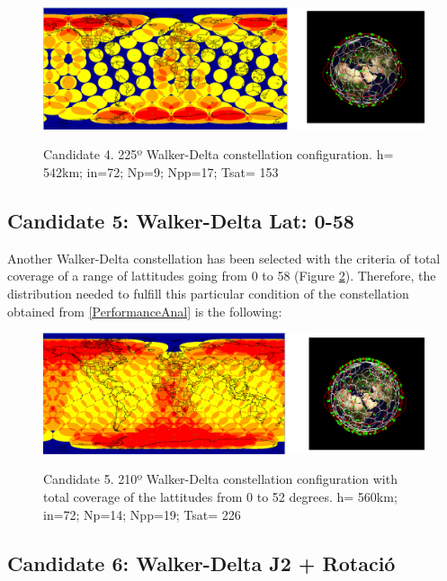 \begin{figure}%
	\centering
	\includegraphics[width=1\textwidth]{Candidate4.png}\\
	\caption{Candidate 4. 225º Walker-Delta constellation configuration.
			 h= 542km; in=72; Np=9; Npp=17; Tsat= 153}
	\label{fig:Candidate4}
\end{figure}



\subsection{Candidate 5: Walker-Delta Lat: 0-58}

Another Walker-Delta constellation has been selected with the criteria of total coverage of a range of lattitudes going from 0 to 58 (Figure \ref{fig:Candidate5}). Therefore, the distribution needed to fulfill this particular condition of the constellation obtained from \ref{PerformanceAnal} is the following:

\begin{figure}%
	\centering
	\includegraphics[width=1\textwidth]{Candidate5.png}\\
	\caption{Candidate 5. 210º Walker-Delta constellation configuration with total coverage of the lattitudes from 0 to 52 degrees.
			 h= 560km; in=72; Np=14; Npp=19; Tsat= 226} 
	\label{fig:Candidate5}
\end{figure}


\subsection{Candidate 6: Walker-Delta J2 + Rotació}

